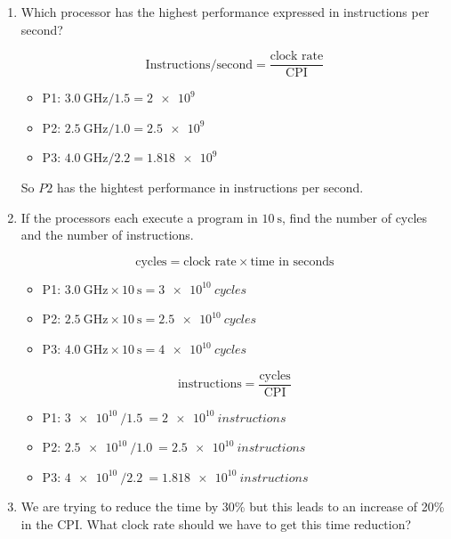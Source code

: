 \documentclass[paper=a4, fontsize=11pt]{scrartcl} %
\begin{document}
\begin{enumerate}
\item
  \begin{fancyquotes}
    Which processor has the highest performance expressed in
    instructions per second?
  \end{fancyquotes}

  $$\text{Instructions} / \text{second} = \frac{\text{clock rate}}{\text{CPI}}$$

  \begin{itemize}
  \item{P1:} $\SI{3.0}{\giga\hertz} / 1.5 = \SI{2e9}{}$
  \item{P2:} $\SI{2.5}{\giga\hertz} / 1.0 = \SI{2.5e9}{}$
  \item{P3:} $\SI{4.0}{\giga\hertz} / 2.2 = \SI{1.818e9}{}$
  \end{itemize}

  So $P2$ has the hightest performance in instructions per second.

\item
  \begin{fancyquotes}
    If the processors each execute a program in $\SI{10}{\second}$,
    find the number of cycles and the number of instructions.
  \end{fancyquotes}

  $$\text{cycles} = \text{clock rate} \times \text{time in seconds}$$

  \begin{itemize}
  \item{P1:} $\SI{3.0}{\giga\hertz}\times\SI{10}{\second} = \SI{3e10}{cycles}$
  \item{P2:} $\SI{2.5}{\giga\hertz}\times\SI{10}{\second} = \SI{2.5e10}{cycles}$
  \item{P3:} $\SI{4.0}{\giga\hertz}\times\SI{10}{\second} = \SI{4e10}{cycles}$
  \end{itemize}

  $$\text{instructions} = \frac{\text{cycles}}{\text{CPI}}$$

  \begin{itemize}
  \item{P1:} $\SI{3e10}{} / \SI{1.5}{} = \SI{2e10}{instructions}$
  \item{P2:} $\SI{2.5e10}{} / \SI{1.0}{} = \SI{2.5e10}{instructions}$
  \item{P3:} $\SI{4e10}{} / \SI{2.2}{} = \SI{1.818e10}{instructions}$
  \end{itemize}

\item
  \begin{fancyquotes}
    We are trying to reduce the time by 30\% but this leads to an
    increase of 20\% in the CPI\@. What clock rate should we have to get
    this time reduction?
  \end{fancyquotes}


\end{enumerate}
\end{document}
